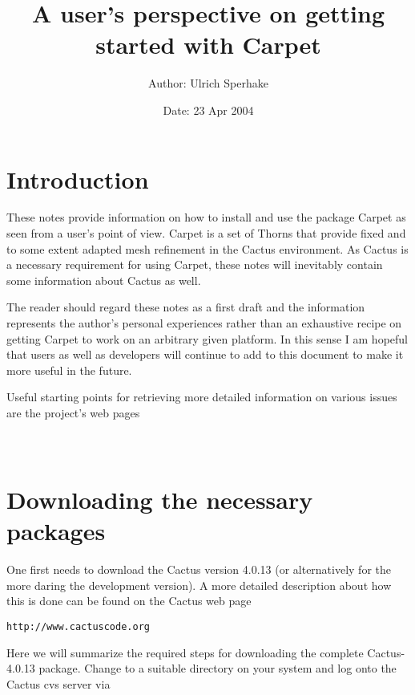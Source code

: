\documentclass[11pt]{article}
\numberwithin{equation}{section}
\begin{document}
\title{A user's perspective on getting started with Carpet}
\author{Author: Ulrich Sperhake}
\date{Date: 23 Apr 2004}
\maketitle



\section{Introduction}

These notes provide information on how to install and use the package
Carpet as seen from a user's point of view. Carpet is a set of Thorns
that provide fixed and to some extent adapted mesh refinement in
the Cactus environment. As Cactus is a necessary requirement for
using Carpet, these notes will inevitably contain some information about
Cactus as well.

The reader should regard these notes as a first draft and the information
represents the author's personal experiences rather than an exhaustive
recipe on getting Carpet to work on an arbitrary given platform. In this sense I
am hopeful that users as well as developers will continue to add to this
document to make it more useful in the future.

Useful starting points for retrieving more detailed information on
various issues are the project's web pages\\

\hspace{1cm}{\tt http://www.cactuscode.org}\\

\hspace{1cm}{\tt http://www.carpetcode.org}\\


\section{Downloading the necessary packages}

One first needs to download the Cactus version 4.0.13 (or
alternatively for the more daring the development version).
A more detailed description about how this is done can be found on the
Cactus web page
%
\begin{center}
  {\tt http://www.cactuscode.org}
\end{center}
%
Here we will summarize the required steps for downloading the complete
Cactus-4.0.13 package. Change to a suitable directory on your system
and log onto the Cactus cvs server via\\
\end{document}

